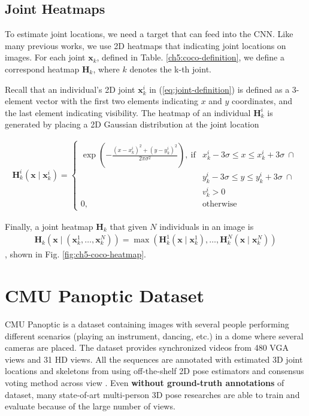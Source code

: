 \subsection{Joint Heatmaps}
To estimate joint locations, we need a target that can feed into the CNN. Like many previous works, we use 2D heatmaps that indicating joint locations on images. For each joint $\mathbf{x}_k$, defined in Table. \ref{ch5:coco-definition}, we define a correspond heatmap $\mathbf{H}_k$, where $k$ denotes the k-th joint.

Recall that an individual's 2D joint $\mathbf{x}_k^i$ in (\ref{eq:joint-definition}) is defined as a 3-element vector with the first two elements indicating $x$ and $y$ coordinates, and the last element indicating visibility. The heatmap of an individual $\mathbf{H}_k^i$ is generated by placing a 2D Gaussian distribution at the joint location

\begin{gather}
\mathbf{H}_k^i(\mathbf{x}\mid\mathbf{x}_k^i) = 
\begin{cases}
\exp\left(-\frac{(x-x_k^i)^2 + (y-y_k^i)^2}{2\pi\sigma^2}\right),\ \text{if} & 
x_k^i - 3\sigma \leq x \leq x_k^i + 3\sigma \ \cap \\ 
& y_k^i - 3\sigma \leq y \leq y_k^i + 3\sigma \ \cap \\
& v_k^i > 0 \\
0, & \text{otherwise}
\end{cases}
\label{eq:joint-definition}
\end{gather}

Finally, a joint heatmap $\mathbf{H}_k$ that given $N$ individuals in an image is
\begin{gather}
\mathbf{H}_k(\mathbf{x}\mid(\mathbf{x}_k^1, \dots,  \mathbf{x}_k^N)) = 
\max \left(\mathbf{H}_k^1(\mathbf{x}\mid\mathbf{x}_k^1), \dots, \mathbf{H}_k^N(\mathbf{x}\mid\mathbf{x}_k^N)\right)
\label{eq:joint-heatmap}
\end{gather}
, shown in Fig. \ref{fig:ch5-coco-heatmap}.

\section{CMU Panoptic Dataset}
CMU Panoptic \cite{cmu-panoptic} is a dataset containing images with several people performing different scenarios (playing an instrument, dancing, etc.) in a dome
where several cameras are placed. The dataset provides synchronized videos from 480 VGA views and 31 HD views. All the sequences are annotated with estimated 3D joint locations and skeletons from using off-the-shelf 2D pose estimators and consensus voting method across view \cite{cmu-panoptic}. Even \textbf{without ground-truth annotations} of dataset, many state-of-art multi-person 3D pose researches \cite{voxelpose,Chen_2020_CVPR,20204DAssociation,iskakov2019learnable} are able to train and evaluate because of the large number of views.
